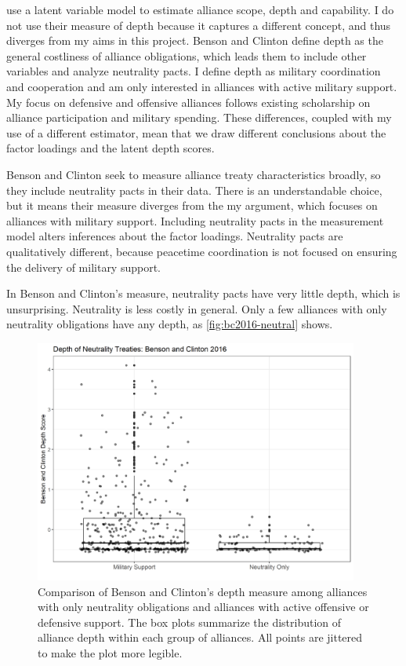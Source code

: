 \documentclass[12pt]{article}
\begin{document}
\citet{BensonClinton2016} use a latent variable model to estimate alliance scope, depth and capability. 
I do not use their measure of depth because it captures a different concept, and thus diverges from my aims in this project. 
Benson and Clinton define depth as the general costliness of alliance obligations, which leads them to include other variables and analyze neutrality pacts. 
I define depth as military coordination and cooperation and am only interested in alliances with active military support. 
My focus on defensive and offensive alliances follows existing scholarship on alliance participation and military spending.
These differences, coupled with my use of a different estimator, mean that we draw different conclusions about the factor loadings and the latent depth scores.


Benson and Clinton seek to measure alliance treaty characteristics broadly, so they include neutrality pacts in their data. 
There is an understandable choice, but it means their measure diverges from the my argument, which focuses on alliances with military support. 
Including neutrality pacts in the measurement model alters inferences about the factor loadings. 
Neutrality pacts are qualitatively different, because peacetime coordination is not focused on ensuring the delivery of military support. 


In Benson and Clinton's measure, neutrality pacts have very little depth, which is unsurprising.
Neutrality is less costly in general.  
Only a few alliances with only neutrality obligations have any depth, as \autoref{fig:bc2016-neutral} shows.  


\begin{figure}[htbp]
	\centering
		\includegraphics[width=0.95\textwidth]{bc2016-neutral.png}
	\caption{Comparison of Benson and Clinton's depth measure among alliances with only neutrality obligations and alliances with active offensive or defensive support. The box plots summarize the distribution of alliance depth within each group of alliances. All points are jittered to make the plot more legible.}
	\label{fig:bc2016-neutral}
\end{figure}
\end{document}
